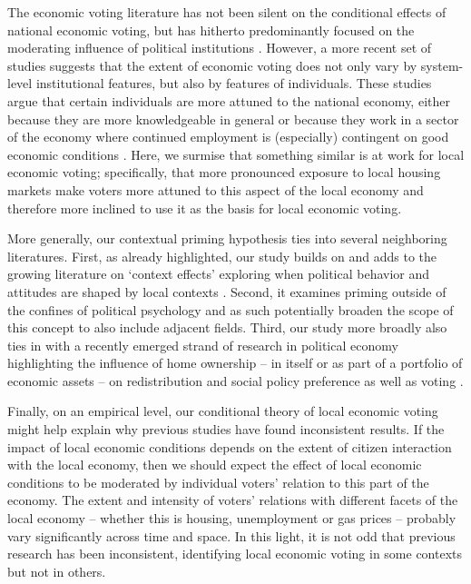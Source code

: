 \documentclass[12pt,a4paper]{article}
\begin{document}
	The economic voting literature has not been silent on the conditional effects of national economic voting, but has hitherto predominantly focused on the moderating influence of political institutions \cite[cf.]{powell1993cross, duch2008economic}. However, a more recent set of studies suggests that the extent of economic voting does not only vary by system-level institutional features, but also by features of individuals. These studies argue that certain individuals are more attuned to the national economy, either because they are more knowledgeable in general \citep{vries2014holding} or because they work in a sector of the economy where continued employment is (especially) contingent on good economic conditions \citep{singer2011says, singer2011voters,singer2013goes, fossati2014economic}. Here, we surmise that something similar is at work for local economic voting; specifically, that more pronounced exposure to local housing markets make voters more attuned to this aspect of the local economy and therefore more inclined to use it as the basis for local economic voting.
	
	More generally, our contextual priming hypothesis ties into several neighboring literatures. First, as already highlighted, our study builds on and adds to the growing literature on `context effects' exploring when political behavior and attitudes are shaped by local contexts \citep[e.g.,][]{hopkins2010politicized,danckert2017reacting}. Second, it examines priming outside of the confines of political psychology and as such potentially broaden the scope of this concept to also include adjacent fields. Third, our study more broadly also ties in with a recently emerged strand of research in political economy highlighting the influence of home ownership -- in itself or as part of a portfolio of economic assets -- on redistribution and social policy preference as well as voting \citep{ansell2014political,nadeau2010patrimonial,stubager2013reaching}. 
	
	Finally, on an empirical level, our conditional theory of local economic voting might help explain why previous studies have found inconsistent results. If the impact of local economic conditions depends on the extent of citizen interaction with the local economy, then we should expect the effect of local economic conditions to be moderated by individual voters’ relation to this part of the economy. The extent and intensity of voters’ relations  with different facets of the local economy – whether this is housing, unemployment or gas prices – probably vary significantly across time and space. In this light, it is not odd that previous research has been inconsistent, identifying local economic voting in some contexts but not in others.
	
\end{document}
